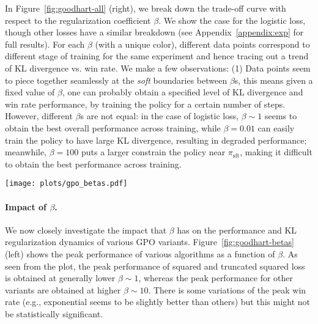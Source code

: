 In Figure~\ref{fig:goodhart-all} (right), we break down the trade-off curve with respect to the regularization coefficient $\beta$. We show the case for the logistic loss, though other losses have a similar breakdown (see Appendix~\ref{appendix:exp} for full results). For each $\beta$ (with a unique color), different data points correspond to different stage of training for the same experiment and hence tracing out a trend of KL divergence vs. win rate. We make a few observations: (1) Data points seem to piece together seamlessly at the \emph{soft} boundaries between $\beta$s, this means given a fixed value of $\beta$, one can probably obtain a specified level of KL divergence and win rate performance, by training the policy for a certain number of steps. However, different $\beta$s are not equal: in the case of logistic loss, $\beta \sim 1$ seems to obtain the best overall performance across training, while $\beta=0.01$ can easily train the policy to have large KL divergence, resulting in degraded performance; meanwhile, $\beta=100$ puts a larger constrain the policy near $\pi_\text{sft}$, making it difficult to obtain the best performance across training.

\begin{figure*}
    \centering
    \texttt{[image: plots/gpo\_betas.pdf]}
    \caption{Left: $90\%$-th percentile performance during training for different values of $\beta$s. We use the $90\%$-th percentile as an estimate of the best possible performance under a fixed $\beta$. Different GPO variants seem to peak at different values of $\beta$: noticeably, squared loss and truncated squared loss peak at about $\beta=1$ while others mostly peak at slightly larger values $\beta\sim 10$. Right: Median values of KL divergence during training, as a function of $\beta$ for different GPO variants. When $\beta$ is small, different variants have little distinction; when $\beta$ is large (strong regularization) and fixed, squared and truncated squared loss tend to incur smaller KL divergence compared to other variants.}
    \label{fig:goodhart-betas}
\end{figure*}

\paragraph{Impact of $\beta$.} We now closely investigate the impact that $\beta$ has on the performance and KL regularization dynamics of various GPO variants. Figure~\ref{fig:goodhart-betas} (left) shows the peak performance of various algorithms as a function of $\beta$. As seen from the plot, the peak performance of squared and truncated squared loss is obtained at generally lower $\beta\sim 1$, whereas the peak performance for other variants are obtained at higher $\beta\sim 10$. There is some variations of the peak win rate (e.g., exponential seems to be slightly better than others) but this might not be statistically significant.

